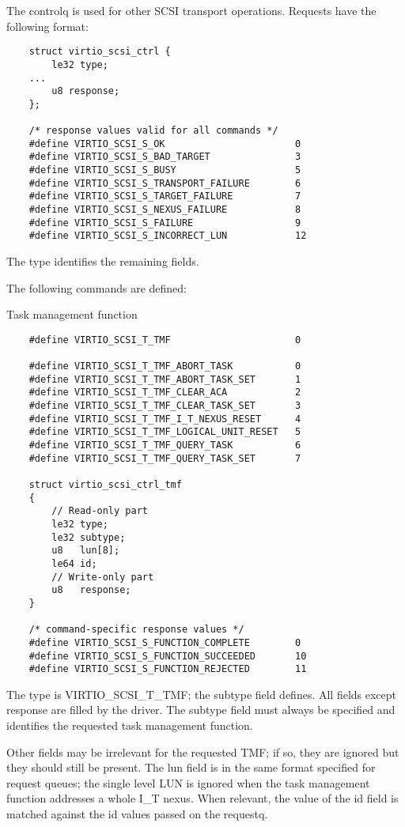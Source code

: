 The controlq is used for other SCSI transport operations.
Requests have the following format:

\begin{lstlisting}
	struct virtio_scsi_ctrl {
		le32 type;
	...
		u8 response;
	};

	/* response values valid for all commands */
	#define VIRTIO_SCSI_S_OK                       0
	#define VIRTIO_SCSI_S_BAD_TARGET               3
	#define VIRTIO_SCSI_S_BUSY                     5
	#define VIRTIO_SCSI_S_TRANSPORT_FAILURE        6
	#define VIRTIO_SCSI_S_TARGET_FAILURE           7
	#define VIRTIO_SCSI_S_NEXUS_FAILURE            8
	#define VIRTIO_SCSI_S_FAILURE                  9
	#define VIRTIO_SCSI_S_INCORRECT_LUN            12
\end{lstlisting}

The type identifies the remaining fields.

The following commands are defined:

  Task management function
\begin{lstlisting}
	#define VIRTIO_SCSI_T_TMF                      0

	#define VIRTIO_SCSI_T_TMF_ABORT_TASK           0
	#define VIRTIO_SCSI_T_TMF_ABORT_TASK_SET       1
	#define VIRTIO_SCSI_T_TMF_CLEAR_ACA            2
	#define VIRTIO_SCSI_T_TMF_CLEAR_TASK_SET       3
	#define VIRTIO_SCSI_T_TMF_I_T_NEXUS_RESET      4
	#define VIRTIO_SCSI_T_TMF_LOGICAL_UNIT_RESET   5
	#define VIRTIO_SCSI_T_TMF_QUERY_TASK           6
	#define VIRTIO_SCSI_T_TMF_QUERY_TASK_SET       7

	struct virtio_scsi_ctrl_tmf
	{
		// Read-only part
		le32 type;
		le32 subtype;
		u8   lun[8];
		le64 id;
		// Write-only part
		u8   response;
	}

	/* command-specific response values */
	#define VIRTIO_SCSI_S_FUNCTION_COMPLETE        0
	#define VIRTIO_SCSI_S_FUNCTION_SUCCEEDED       10
	#define VIRTIO_SCSI_S_FUNCTION_REJECTED        11
\end{lstlisting}

  The type is VIRTIO_SCSI_T_TMF; the subtype field defines. All
  fields except response are filled by the driver. The subtype
  field must always be specified and identifies the requested
  task management function.

  Other fields may be irrelevant for the requested TMF; if so,
  they are ignored but they should still be present. The lun
  field is in the same format specified for request queues; the
  single level LUN is ignored when the task management function
  addresses a whole I_T nexus. When relevant, the value of the id
  field is matched against the id values passed on the requestq.

